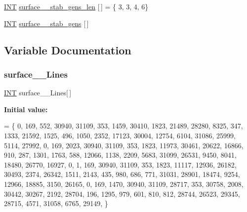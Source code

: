 \begin{DoxyCompactItemize}
\item 
\mbox{\hyperlink{galois_8h_a09fddde158a3a20bd2dcadb609de11dc}{I\+NT}} \mbox{\hyperlink{surface__13_8_c_a8840876791e159f3a25d9a6f2de98bae}{surface\+\_\+\_\+stab\+\_\+gens\+\_\+len}} \mbox{[}$\,$\mbox{]} = \{ 3, 3, 4, 6\}
\item 
\mbox{\hyperlink{galois_8h_a09fddde158a3a20bd2dcadb609de11dc}{I\+NT}} \mbox{\hyperlink{surface__13_8_c_a019a1e7dba79917b935d858a9fbe87c0}{surface\+\_\+\_\+stab\+\_\+gens}} \mbox{[}$\,$\mbox{]}
\end{DoxyCompactItemize}


\subsection{Variable Documentation}
\mbox{\label{surface__13_8_c_a03794e22872bf9a20f958ad692ab76bf}} 
\subsubsection{\texorpdfstring{surface\+\_\+\_\+\+Lines}{surface\_13\_Lines}}
{\footnotesize\ttfamily \mbox{\hyperlink{galois_8h_a09fddde158a3a20bd2dcadb609de11dc}{I\+NT}} surface\+\_\+\_\+\+Lines\mbox{[}$\,$\mbox{]}}

{\bfseries Initial value\+:}
\begin{DoxyCode}
= \{ 
    0, 169, 552, 30940, 31109, 353, 1459, 30410, 1823, 21489, 28280, 8325, 347, 1333, 21592, 1525, 496, 
      1050, 2352, 17123, 30004, 12754, 6104, 31086, 25999, 5114, 27992, 
    0, 169, 2023, 30940, 31109, 353, 1823, 11973, 30461, 20622, 16866, 910, 287, 1301, 1763, 588, 12066, 
      1138, 2209, 5683, 31099, 26531, 9450, 8041, 18480, 26770, 16927, 
    0, 1, 169, 30940, 31109, 353, 1823, 11117, 12936, 26182, 30493, 2374, 26342, 1511, 2143, 435, 980, 686,
       771, 31031, 28901, 18474, 9254, 12966, 18885, 3150, 26165, 
    0, 169, 1470, 30940, 31109, 28717, 353, 30758, 2008, 30442, 30267, 2192, 28704, 196, 1295, 979, 601, 
      810, 812, 28744, 26523, 29345, 28715, 4571, 31058, 6765, 29149, 
\}
\end{DoxyCode}
\mbox{\label{surface__13_8_c_ae7518b990917658273c52d41d611f2e6}} 
